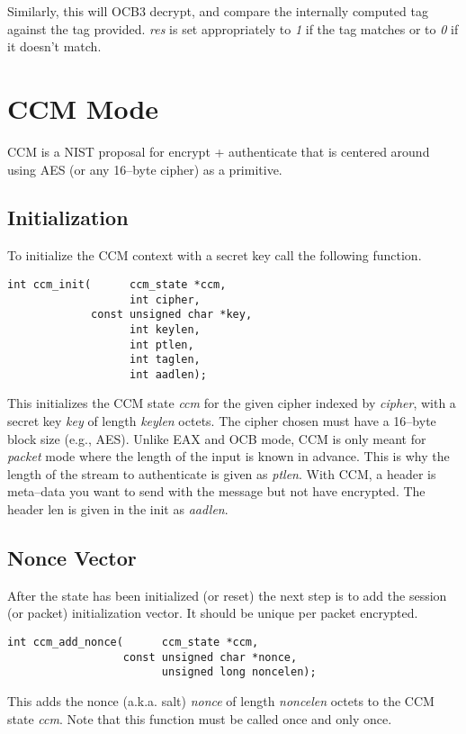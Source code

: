 \documentclass[synpaper]{book}
\newcommand{\mysection}[1]    %
	{                   %
	\section{#1}
   \markboth{\textsf{www.libtom.net}}{\thesection ~ {#1}}
	}
\begin{document}
Similarly, this will OCB3 decrypt, and compare the internally computed tag against the tag provided. \textit{res} is set
appropriately to \textit{1} if the tag matches or to \textit{0} if it doesn't match.

\mysection{CCM Mode}
CCM is a NIST proposal for encrypt + authenticate that is centered around using AES (or any 16--byte cipher) as a primitive.

\subsection{Initialization}
To initialize the CCM context with a secret key call the following function.

\begin{verbatim}
int ccm_init(      ccm_state *ccm,
                   int cipher,
             const unsigned char *key,
                   int keylen,
                   int ptlen,
                   int taglen,
                   int aadlen);
\end{verbatim}
This initializes the CCM state \textit{ccm} for the given cipher indexed by \textit{cipher}, with a secret key \textit{key} of length \textit{keylen} octets. The cipher
chosen must have a 16--byte block size (e.g., AES).
Unlike EAX and OCB mode, CCM is only meant for \textit{packet} mode where the length of the input is known in advance. This is why the length of the stream
to authenticate is given as \textit{ptlen}.
With CCM, a header is meta--data you want to send with the message but not have encrypted. The header len is given in the init
as \textit{aadlen}.

\subsection{Nonce Vector}
After the state has been initialized (or reset) the next step is to add the session (or packet) initialization vector.  It should be unique per packet encrypted.

\begin{verbatim}
int ccm_add_nonce(      ccm_state *ccm,
                  const unsigned char *nonce,
                        unsigned long noncelen);
\end{verbatim}

This adds the nonce (a.k.a. salt) \textit{nonce} of length \textit{noncelen} octets to the CCM state \textit{ccm}. Note that this function must be called
once and only once.
\end{document}
